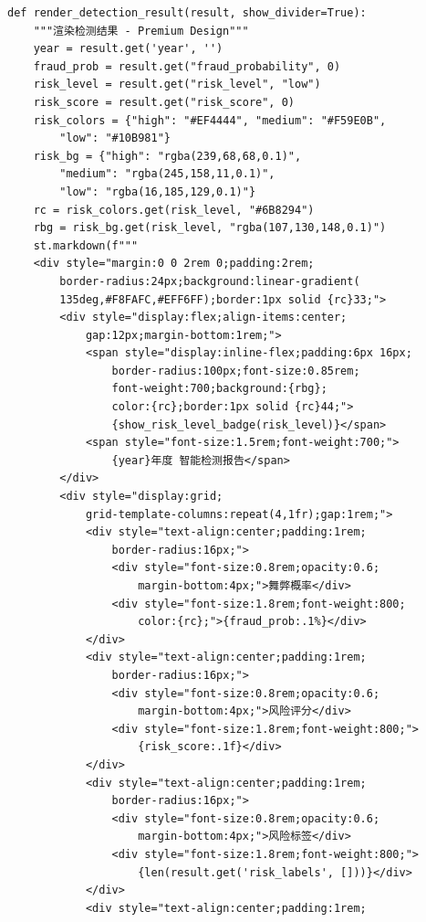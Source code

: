 \documentclass[a4paper,10pt]{article}
\begin{document}
\begin{lstlisting}
def render_detection_result(result, show_divider=True):
    """渲染检测结果 - Premium Design"""
    year = result.get('year', '')
    fraud_prob = result.get("fraud_probability", 0)
    risk_level = result.get("risk_level", "low")
    risk_score = result.get("risk_score", 0)
    risk_colors = {"high": "#EF4444", "medium": "#F59E0B",
        "low": "#10B981"}
    risk_bg = {"high": "rgba(239,68,68,0.1)",
        "medium": "rgba(245,158,11,0.1)",
        "low": "rgba(16,185,129,0.1)"}
    rc = risk_colors.get(risk_level, "#6B8294")
    rbg = risk_bg.get(risk_level, "rgba(107,130,148,0.1)")
    st.markdown(f"""
    <div style="margin:0 0 2rem 0;padding:2rem;
        border-radius:24px;background:linear-gradient(
        135deg,#F8FAFC,#EFF6FF);border:1px solid {rc}33;">
        <div style="display:flex;align-items:center;
            gap:12px;margin-bottom:1rem;">
            <span style="display:inline-flex;padding:6px 16px;
                border-radius:100px;font-size:0.85rem;
                font-weight:700;background:{rbg};
                color:{rc};border:1px solid {rc}44;">
                {show_risk_level_badge(risk_level)}</span>
            <span style="font-size:1.5rem;font-weight:700;">
                {year}年度 智能检测报告</span>
        </div>
        <div style="display:grid;
            grid-template-columns:repeat(4,1fr);gap:1rem;">
            <div style="text-align:center;padding:1rem;
                border-radius:16px;">
                <div style="font-size:0.8rem;opacity:0.6;
                    margin-bottom:4px;">舞弊概率</div>
                <div style="font-size:1.8rem;font-weight:800;
                    color:{rc};">{fraud_prob:.1%}</div>
            </div>
            <div style="text-align:center;padding:1rem;
                border-radius:16px;">
                <div style="font-size:0.8rem;opacity:0.6;
                    margin-bottom:4px;">风险评分</div>
                <div style="font-size:1.8rem;font-weight:800;">
                    {risk_score:.1f}</div>
            </div>
            <div style="text-align:center;padding:1rem;
                border-radius:16px;">
                <div style="font-size:0.8rem;opacity:0.6;
                    margin-bottom:4px;">风险标签</div>
                <div style="font-size:1.8rem;font-weight:800;">
                    {len(result.get('risk_labels', []))}</div>
            </div>
            <div style="text-align:center;padding:1rem;

\end{lstlisting}
\end{document}
